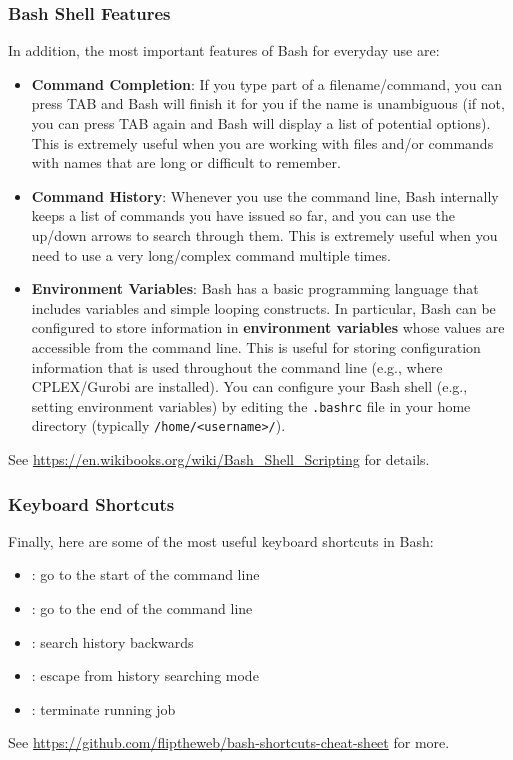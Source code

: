 \documentclass[12pt]{article}
\begin{document}
\subsubsection{Bash Shell Features}
In addition, the most important features of Bash for everyday use are:
\begin{itemize}
    \item \textbf{Command Completion}: If you type part of a filename/command, you can press TAB and Bash will finish it for you if the name is unambiguous (if not, you can press TAB again and Bash will display a list of potential options). This is extremely useful when you are working with files and/or commands with names that are long or difficult to remember.
    \item \textbf{Command History}: Whenever you use the command line, Bash internally keeps a list of commands you have issued so far, and you can use the up/down arrows to search through them. This is extremely useful when you need to use a very long/complex command multiple times.
    \item \textbf{Environment Variables}: Bash has a basic programming language that includes variables and simple looping constructs. In particular, Bash can be configured to store information in \textbf{environment variables} whose values are accessible from the command line. This is useful for storing configuration information that is used throughout the command line (e.g., where CPLEX/Gurobi are installed). You can configure your Bash shell (e.g., setting environment variables) by editing the \texttt{.bashrc} file in your home directory (typically \texttt{/home/<username>/}).
\end{itemize}

See \url{https://en.wikibooks.org/wiki/Bash_Shell_Scripting} for details.

\subsubsection{Keyboard Shortcuts}
Finally, here are some of the most useful keyboard shortcuts in Bash:
\begin{itemize}
    \item {}: go to the start of the command line
    \item {}: go to the end of the command line
    \item {}: search history backwards
    \item {}: escape from history searching mode
    \item {}: terminate running job
\end{itemize}
See \url{https://github.com/fliptheweb/bash-shortcuts-cheat-sheet} for more.
\end{document}
